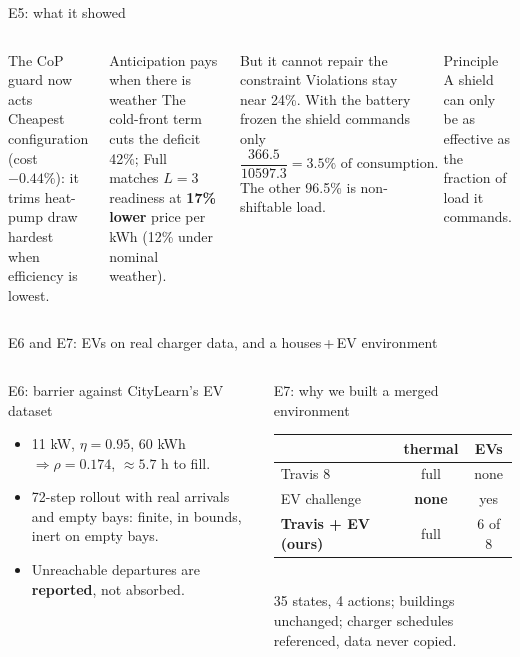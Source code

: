 \documentclass[aspectratio=169,10pt]{beamer}
\begin{document}
\begin{frame}{E5: what it showed}
\begin{columns}[T]
\begin{exampleblock}{The CoP guard now acts}
Cheapest configuration (cost $-0.44\%$): it trims heat-pump draw hardest when efficiency is lowest.
\end{exampleblock}
\begin{exampleblock}{Anticipation pays when there is weather}
The cold-front term cuts the deficit 42\%; Full matches $L = 3$ readiness at \textbf{17\% lower} price per kWh (12\% under nominal weather).
\end{exampleblock}
\begin{alertblock}{But it cannot repair the constraint}
Violations stay near 24\%. With the battery frozen the shield commands only
\[
\frac{366.5}{10597.3} = 3.5\% \text{ of consumption.}
\]
The other 96.5\% is non-shiftable load.
\end{alertblock}
\begin{block}{Principle}
A shield can only be as effective as the fraction of load it commands.
\end{block}
\end{columns}
\end{frame}

\begin{frame}{E6 and E7: EVs on real charger data, and a houses\,+\,EV environment}
\begin{columns}[T]
\begin{block}{E6: barrier against CityLearn's EV dataset}
\begin{itemize}
  \item 11 kW, $\eta = 0.95$, 60 kWh $\Rightarrow \rho = 0.174$, $\approx 5.7$ h to fill.
  \item 72-step rollout with real arrivals and empty bays: finite, in bounds, inert on empty bays.
  \item Unreachable departures are \textbf{reported}, not absorbed.
\end{itemize}
\end{block}
\begin{block}{E7: why we built a merged environment}
\small
\begin{tabular}{@{}lcc@{}}
\toprule
 & thermal & EVs \\
\midrule
Travis 8 & full & none \\
EV challenge & \textbf{none} & yes \\
\textbf{Travis + EV (ours)} & full & 6 of 8 \\
\bottomrule
\end{tabular}\\[3pt]
35 states, 4 actions; buildings unchanged; charger schedules referenced, data never copied.
\end{block}
\end{columns}
\end{frame}
\end{document}
